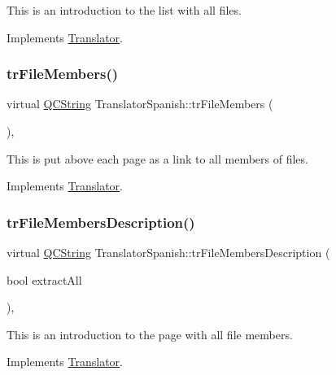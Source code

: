 This is an introduction to the list with all files. 

Implements \mbox{\hyperlink{class_translator}{Translator}}.

\mbox{\label{class_translator_spanish_a217a724469cd7c90c2f78208f541433f}} 
\subsubsection{\texorpdfstring{trFileMembers()}{trFileMembers()}}
{\footnotesize\ttfamily virtual \mbox{\hyperlink{class_q_c_string}{Q\+C\+String}} Translator\+Spanish\+::tr\+File\+Members (\begin{DoxyParamCaption}{ }\end{DoxyParamCaption})\hspace{0.3cm}{\ttfamily [inline]}, {\ttfamily [virtual]}}

This is put above each page as a link to all members of files. 

Implements \mbox{\hyperlink{class_translator}{Translator}}.

\mbox{\label{class_translator_spanish_a19088b9a061bced85fe778e923c952c9}} 
\subsubsection{\texorpdfstring{trFileMembersDescription()}{trFileMembersDescription()}}
{\footnotesize\ttfamily virtual \mbox{\hyperlink{class_q_c_string}{Q\+C\+String}} Translator\+Spanish\+::tr\+File\+Members\+Description (\begin{DoxyParamCaption}\item[{bool}]{extract\+All }\end{DoxyParamCaption})\hspace{0.3cm}{\ttfamily [inline]}, {\ttfamily [virtual]}}

This is an introduction to the page with all file members. 

Implements \mbox{\hyperlink{class_translator}{Translator}}.

\mbox{\label{class_translator_spanish_a930a45131b65f01f5baa429e80aebb0e}} 
